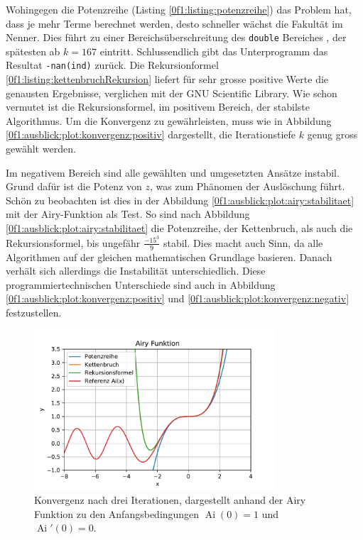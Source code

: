 Wohingegen die Potenzreihe (Listing \ref{0f1:listing:potenzreihe}) das Problem hat, dass je mehr Terme berechnet werden, desto schneller wächst die Fakultät im Nenner. Dies führt zu einer Bereichsüberschreitung des \verb+double+ Bereiches \cite{0f1:double}, der spätesten ab $k=167$ eintritt. Schlussendlich gibt das Unterprogramm das Resultat \verb+-nan(ind)+ zurück.
Die Rekursionformel \eqref{0f1:listing:kettenbruchRekursion} liefert für sehr grosse positive Werte die genausten Ergebnisse, verglichen mit der GNU Scientific Library. Wie schon vermutet ist die Rekursionsformel, im positivem Bereich, der stabilste Algorithmus. Um die Konvergenz zu gewährleisten, muss wie in Abbildung \ref{0f1:ausblick:plot:konvergenz:positiv} dargestellt, die Iterationstiefe $k$ genug gross gewählt werden.

Im negativem Bereich sind alle gewählten und umgesetzten Ansätze instabil. Grund dafür ist die Potenz von $z$, was zum Phänomen der Auslöschung \cite{0f1:SeminarNumerik} führt. Schön zu beobachten ist dies in der Abbildung \ref{0f1:ausblick:plot:airy:stabilitaet} mit der Airy-Funktion als Test. So sind nach Abbildung \ref{0f1:ausblick:plot:airy:stabilitaet} die Potenzreihe, der Kettenbruch, als auch die Rekursionsformel, bis ungefähr $\frac{-15^3}{9}$ stabil. Dies macht auch Sinn, da alle Algorithmen auf der gleichen mathematischen Grundlage basieren. Danach verhält sich allerdings die Instabilität unterschiedlich. Diese programmiertechnischen Unterschiede sind auch in Abbildung \ref{0f1:ausblick:plot:konvergenz:positiv} und \ref{0f1:ausblick:plot:konvergenz:negativ} festzustellen.

\begin{figure}
    \centering
    \includegraphics[width=0.8\textwidth]{papers/0f1/images/konvergenzAiry.pdf}
    \caption{Konvergenz nach drei Iterationen, dargestellt anhand der Airy Funktion zu den Anfangsbedingungen $\operatorname{Ai}(0)=1$ und $\operatorname{Ai}'(0)=0$.
    \label{0f1:ausblick:plot:airy:konvergenz}}
\end{figure}

